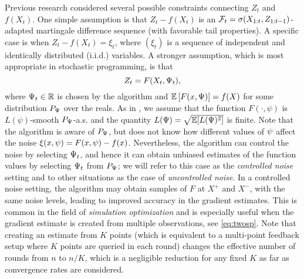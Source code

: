 Previous research considered several possible constraints connecting $Z_t$ and $f(X_t)$.
One simple assumption is that $Z_t-f(X_t)$ is an $\mathcal{F}_t = \sigma(X_{1:t},Z_{1:t-1})$-adapted martingale difference sequence (with favorable tail properties).
A specific case is when $Z_t - f(X_t) = \xi_t$, where $(\xi_t)$ is a sequence of independent and identically distributed (i.i.d.) variables.
A stronger assumption, which is most appropriate in stochastic programming,
is that 
\begin{equation}
\label{eq:controlled}
Z_t = F(X_t,\Psi_t),
\end{equation} where $\Psi_t\in \mathbb{R}$ is chosen by the algorithm and $\mathbb{E}\left[F(x,\Psi)\right]=f(X)$ for some distribution $P_{\Psi}$ over the reals. As in \cite{duchi2015optimal}, we assume that the function $F(\cdot, \psi)$ is $L(\psi)$-smooth $P_{\Psi}$-a.s. and the quantity $L(\Psi) = \sqrt{\mathbb{E} [L(\Psi)^2]}$ is finite.  
Note that the algorithm is aware of $P_{\Psi}$, but does not know how different values of $\psi$ affect the noise $\xi(x,\psi)=F(x,\psi)-f(x)$. Nevertheless, the algorithm can control the noise by selecting $\Psi_t$, and hence it can obtain unbiased estimates of the function values by selecting $\Psi_t$ from $P_{\Psi}$; we will refer to this case as the \emph{controlled noise} setting and to other situations as the case of \emph{uncontrolled noise}. 
In a controlled noise setting, the algorithm may obtain samples of $F$ at $X^+$ and $X^-$, with the same noise levels, leading to improved accuracy in the gradient estimates. This is common in the field of \emph{simulation optimization}
\citep{KlSpNa99,duchi2015optimal} and is especially useful when the gradient estimate is created from multiple observations, see \eqref{eq:twosp}. Note that creating an estimate from $K$ points (which is equivalent to a multi-point feedback setup where $K$ points are queried in each round) changes the effective number of rounds from $n$ to $n/K$, which is a negligible reduction for any fixed $K$ as far as convergence rates are considered.


%
%


